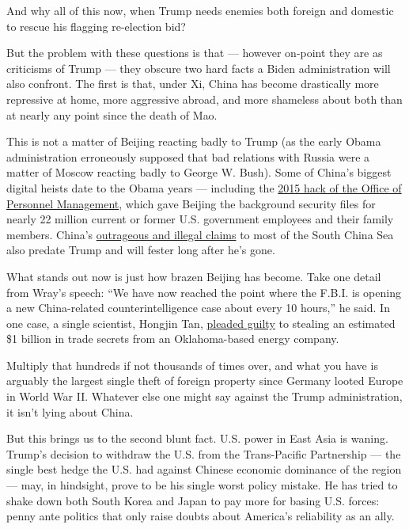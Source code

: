 And why all of this now, when Trump needs enemies both foreign and
domestic to rescue his flagging re-election bid?

But the problem with these questions is that --- however on-point they
are as criticisms of Trump --- they obscure two hard facts a Biden
administration will also confront. The first is that, under Xi, China
has become drastically more repressive at home, more aggressive abroad,
and more shameless about both than at nearly any point since the death
of Mao.

This is not a matter of Beijing reacting badly to Trump (as the early
Obama administration erroneously supposed that bad relations with Russia
were a matter of Moscow reacting badly to George W. Bush). Some of
China's biggest digital heists date to the Obama years --- including the
\href{https://www.lawfareblog.com/why-opm-hack-far-worse-you-imagine}{2015
hack of the Office of Personnel Management}, which gave Beijing the
background security files for nearly 22 million current or former U.S.
government employees and their family members. China's
\href{https://www.nytimes3xbfgragh.onion/2016/07/13/world/asia/south-china-sea-hague-ruling-philippines.html}{outrageous
and illegal claims} to most of the South China Sea also predate Trump
and will fester long after he's gone.

What stands out now is just how brazen Beijing has become. Take one
detail from Wray's speech: ``We have now reached the point where the
F.B.I. is opening a new China-related counterintelligence case about
every 10 hours,'' he said. In one case, a single scientist, Hongjin Tan,
\href{https://www.wsj.com/articles/chinese-national-sentenced-to-prison-in-1-billion-trade-secret-theft-case-11582839551}{pleaded
guilty} to stealing an estimated \$1 billion in trade secrets from an
Oklahoma-based energy company.

Multiply that hundreds if not thousands of times over, and what you have
is arguably the largest single theft of foreign property since Germany
looted Europe in World War II. Whatever else one might say against the
Trump administration, it isn't lying about China.

But this brings us to the second blunt fact. U.S. power in East Asia is
waning. Trump's decision to withdraw the U.S. from the Trans-Pacific
Partnership --- the single best hedge the U.S. had against Chinese
economic dominance of the region --- may, in hindsight, prove to be his
single worst policy mistake. He has tried to shake down both South Korea
and Japan to pay more for basing U.S. forces: penny ante politics that
only raise doubts about America's reliability as an ally.

